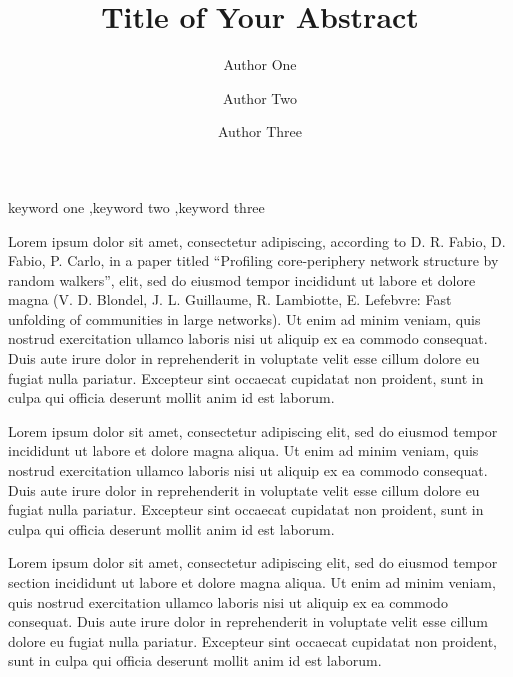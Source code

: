 \documentclass[12pt]{elsarticle}
\begin{document}
\begin{frontmatter}

\title{Title of Your Abstract}
\date{}

\author[1,2,3]{Author One}
\author[2,*]{Author Two}
\author[1]{Author Three}

\address[1]{Department of Computing, Research Group, Av. Brasil, 200, São Paulo, SP, Brazil}
\address[2]{School of Science, University of Technology, 2000 J St. NW, Washington DC, 20036, USA}
\address[3]{Center Of Intelligence, Faculty of Sciences, 50 West 4th Street, New York NY, 37895, USA}
\address[*]{Corresponding author: email2@myemail.com}


\begin{keyword}
keyword one \sep keyword two \sep keyword three
\end{keyword}

\end{frontmatter}



Lorem ipsum dolor sit amet, consectetur adipiscing, according to D. R. Fabio, D. Fabio, P. Carlo, in a paper titled ``Profiling core-periphery network structure by random walkers'',   elit, sed do eiusmod tempor incididunt ut labore et dolore magna  (V. D. Blondel, J. L. Guillaume, R. Lambiotte, E. Lefebvre: Fast unfolding of communities in large networks). Ut enim ad minim veniam, quis nostrud exercitation ullamco laboris nisi ut aliquip ex ea commodo consequat. Duis aute irure dolor in reprehenderit in voluptate velit esse cillum dolore eu fugiat nulla pariatur. Excepteur sint occaecat cupidatat non proident, sunt in culpa qui officia deserunt mollit anim id est laborum.

Lorem ipsum dolor sit amet, consectetur adipiscing elit, sed do eiusmod tempor incididunt ut labore et dolore magna aliqua. Ut enim ad minim veniam, quis nostrud exercitation ullamco laboris nisi ut aliquip ex ea commodo consequat. Duis aute irure dolor in reprehenderit in voluptate velit esse cillum dolore eu fugiat nulla pariatur. Excepteur sint occaecat cupidatat non proident, sunt in culpa qui officia deserunt mollit anim id est laborum.

Lorem ipsum dolor sit amet, consectetur adipiscing elit, sed do eiusmod tempor section incididunt ut labore et dolore magna aliqua. Ut enim ad minim veniam, quis nostrud exercitation ullamco laboris nisi ut aliquip ex ea commodo consequat. Duis aute irure dolor in reprehenderit in voluptate velit esse cillum dolore eu fugiat nulla pariatur. Excepteur sint occaecat cupidatat non proident, sunt in culpa qui officia deserunt mollit anim id est laborum.
\end{document}
